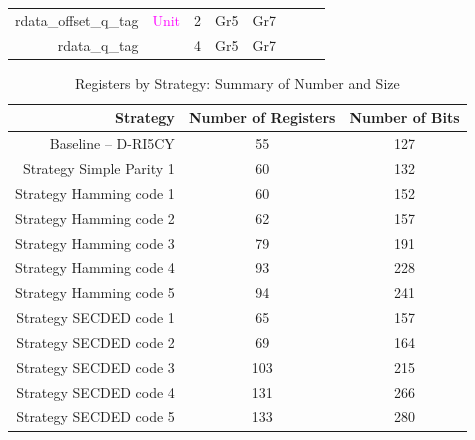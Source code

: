 \begin{table}[t]
\begin{tabular}{@{}rccccccc@{}}
        rdata\_offset\_q\_tag           & \textcolor{magenta}{Unit}             & 2      & Gr5                         & Gr7                            &                             &                             &                             \\
        rdata\_q\_tag                   &                                       & 4      & Gr5                         & Gr7                            &                             &                             &                             \\
        \bottomrule
    \end{tabular}
\end{table}


\begin{table}[t]
    \centering
    \footnotesize
    \caption{Registers by Strategy: Summary of Number and Size}
    \label{tab:strategies_summary}
    \begin{tabular}{rcc}
        \toprule
        Strategy                 & Number of Registers & Number of Bits \\
        \midrule
        Baseline -- D-RI5CY      & 55                  & 127            \\
        Strategy Simple Parity 1 & 60                  & 132            \\
        Strategy Hamming code 1  & 60                  & 152            \\
        Strategy Hamming code 2  & 62                  & 157            \\
        Strategy Hamming code 3  & 79                  & 191            \\
        Strategy Hamming code 4  & 93                  & 228            \\
        Strategy Hamming code 5  & 94                  & 241            \\
        Strategy SECDED code 1   & 65                  & 157            \\
        Strategy SECDED code 2   & 69                  & 164            \\
        Strategy SECDED code 3   & 103                 & 215            \\
        Strategy SECDED code 4   & 131                 & 266            \\
        Strategy SECDED code 5   & 133                 & 280            \\
        \bottomrule
    \end{tabular}
\end{table}


